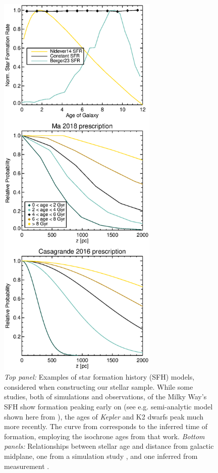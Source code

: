 \documentclass[twocolumn]{aastex631}
\begin{document}
\begin{figure}[htp!]
    \centering
    \includegraphics[width=3in]{figures/age_midplane_distribution.eps}
    \caption{\textit{Top panel:} Examples of star formation history (SFH) models, considered when constructing our stellar sample. While some studies, both of simulations and observations, of the Milky Way's SFH show formation peaking early on (see e.g. semi-analytic model shown here from \cite{nidever_tracing_2014}), the ages of \textit{Kepler} and K2 dwarfs peak much more recently. The curve from \cite{Berger23} corresponds to the inferred time of formation, employing the isochrone ages from that work. \textit{Bottom panels:} Relationships between stellar age and distance from galactic midplane, one from a simulation study \citep{ma_structure_2017}, and one inferred from measurement \citep{casagrande_measuring_2016}.}
    \label{fig:age_midplane}
\end{figure}
\end{document}
